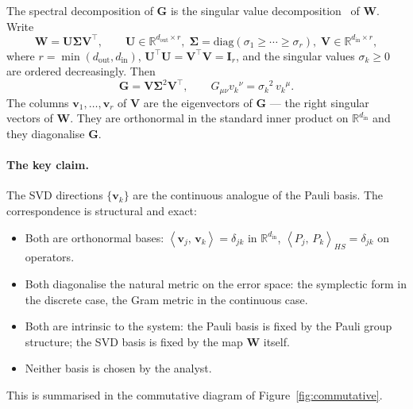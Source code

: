 \documentclass[11pt,a4paper]{article}
\theoremstyle{definition}
\newcommand{\Wm}{\mathbf{W}}
\newcommand{\Gm}{\mathbf{G}}
\newcommand{\Um}{\mathbf{U}}
\newcommand{\Vm}{\mathbf{V}}
\newcommand{\Imat}{\mathbf{I}}
\newcommand{\Sig}{\boldsymbol{\Sigma}}
\newcommand{\vk}[1][]{\mathbf{v}_{#1}}
\newcommand{\Rbb}{\mathbb{R}}
\newcommand{\inner}[2]{\left\langle#1,\,#2\right\rangle}
\newcommand{\dimin}{d_{\mathrm{in}}}
\newcommand{\dimout}{d_{\mathrm{out}}}
\begin{document}
The spectral decomposition of $\Gm$ is the singular value decomposition~\cite{Horn2012} of $\Wm$. Write
\begin{equation}
  \Wm = \Um\Sig\Vm^\top, \qquad
  \Um\in\Rbb^{\dimout\times r},\;
  \Sig = \mathrm{diag}(\sigma_1\geq\cdots\geq\sigma_r),\;
  \Vm\in\Rbb^{\dimin\times r},
  \label{eq:svd}
\end{equation}
where $r = \min(\dimout,\dimin)$, $\Um^\top\Um = \Vm^\top\Vm = \Imat_r$, and the singular values $\sigma_k\geq 0$ are ordered decreasingly. Then
\begin{equation}
  \Gm = \Vm\Sig^2\Vm^\top,
  \qquad
  G_{\mu\nu}v_k{}^\nu = \sigma_k{}^2\, v_k{}^\mu .
  \label{eq:gram_spec}
\end{equation}
The columns $\vk[1],\ldots,\vk[r]$ of $\Vm$ are the eigenvectors of $\Gm$ --- the right singular vectors of $\Wm$. They are orthonormal in the standard inner product on $\Rbb^{\dimin}$ and they diagonalise $\Gm$.

\paragraph{The key claim.}
The SVD directions $\{\vk[k]\}$ are the continuous analogue of the Pauli basis. The correspondence is structural and exact:

\begin{itemize}[nosep]
  \item Both are orthonormal bases: $\inner{\vk[j]}{\vk[k]} = \delta_{jk}$ in $\Rbb^{\dimin}$, $\inner{P_j}{P_k}_{HS} = \delta_{jk}$ on operators.
  \item Both diagonalise the natural metric on the error space: the symplectic form in the discrete case, the Gram metric in the continuous case.
  \item Both are intrinsic to the system: the Pauli basis is fixed by the Pauli group structure; the SVD basis is fixed by the map $\Wm$ itself.
  \item Neither basis is chosen by the analyst.
\end{itemize}
This is summarised in the commutative diagram of Figure~\ref{fig:commutative}.
\end{document}
